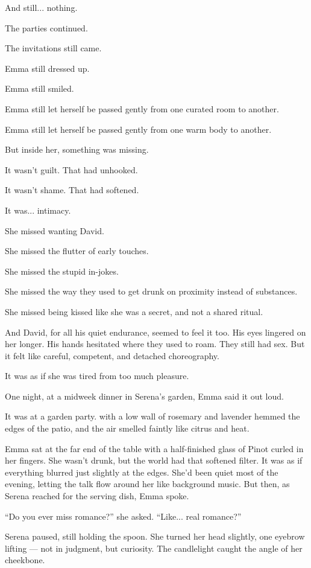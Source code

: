 And still... nothing.

The parties continued.

The invitations still came. 

Emma still dressed up. 

Emma still smiled. 

Emma still let herself be passed gently from one curated room to another.

Emma still let herself be passed gently from one warm body to another. 

But inside her, something was missing.

It wasn’t guilt. That had unhooked.

It wasn’t shame. That had softened.

It was... intimacy.

She missed wanting David. 

She missed the flutter of early touches. 

She missed the stupid in-jokes.

She missed the way they used to get drunk on proximity instead of substances. 

She missed being kissed like she was a secret, and not a shared ritual.

And David, for all his quiet endurance, seemed to feel it too. His eyes lingered on her longer. 
His hands hesitated where they used to roam. They still had sex. But it felt like careful,
competent, and detached choreography. 

It was as if she was tired from too much pleasure.

One night, at a midweek dinner in Serena’s garden, Emma said it out loud.

It was at a garden party. 
with a low wall of rosemary and lavender hemmed the edges of the patio, and the air 
smelled faintly like citrus and heat.

Emma sat at the far end of the table with a half-finished glass of Pinot curled in her fingers. She 
wasn’t drunk, but the world had that softened filter. It was as if everything blurred just slightly 
at the edges. She’d been quiet most of the evening, letting the talk flow around her like background 
music. But then, as Serena reached for the serving dish, Emma spoke.

``Do you ever miss romance?'' she asked. ``Like... real romance?''

Serena paused, still holding the spoon. She turned her head slightly, one eyebrow lifting — not in 
judgment, but curiosity. The candlelight caught the angle of her cheekbone.

